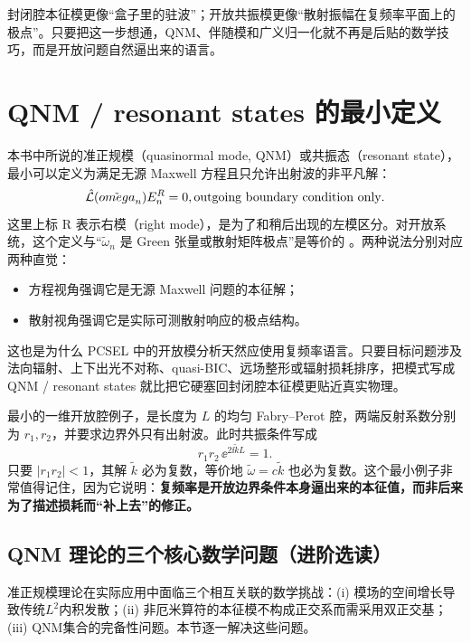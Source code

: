封闭腔本征模更像“盒子里的驻波”；开放共振模更像“散射振幅在复频率平面上的极点”。只要把这一步想通，QNM、伴随模和广义归一化就不再是后贴的数学技巧，而是开放问题自然逼出来的语言。

\section{QNM / resonant states 的最小定义}
本书中所说的准正规模（quasinormal mode, QNM）或共振态（resonant state），最小可以定义为满足无源 Maxwell 方程且只允许出射波的非平凡解：
\begin{equation}
\hat{\mathcal L}(\tilde{\omega}_n)\E_n^{\mathrm{R}}=0,
\qquad
\text{outgoing boundary condition only}.
\label{eq:qnm_definition_appendix}
\end{equation}
这里上标 $\mathrm{R}$ 表示右模（right mode），是为了和稍后出现的左模区分。对开放系统，这个定义与“$\tilde{\omega}_n$ 是 Green 张量或散射矩阵极点”是等价的 \cite{sauvan2013qnm,alpeggiani2017qnm}。两种说法分别对应两种直觉：
\begin{itemize}
  \item 方程视角强调它是无源 Maxwell 问题的本征解；
  \item 散射视角强调它是实际可测散射响应的极点结构。
\end{itemize}

这也是为什么 PCSEL 中的开放模分析天然应使用复频率语言。只要目标问题涉及法向辐射、上下出光不对称、quasi-BIC、远场整形或辐射损耗排序，把模式写成 QNM / resonant states 就比把它硬塞回封闭腔本征模更贴近真实物理。

\begin{ExampleBox}
最小的一维开放腔例子，是长度为 $L$ 的均匀 Fabry--Perot 腔，两端反射系数分别为 $r_1,r_2$，并要求边界外只有出射波。此时共振条件写成
\begin{equation}
r_1r_2\,\ee^{2\ii\tilde{k}L}=1.
\label{eq:qnm_fp_condition}
\end{equation}
只要 $|r_1r_2|<1$，其解 $\tilde{k}$ 必为复数，等价地 $\tilde{\omega}=c\tilde{k}$ 也必为复数。这个最小例子非常值得记住，因为它说明：\textbf{复频率是开放边界条件本身逼出来的本征值，而非后来为了描述损耗而“补上去”的修正。}
\end{ExampleBox}
\subsection{QNM 理论的三个核心数学问题（进阶选读）}
准正规模理论在实际应用中面临三个相互关联的数学挑战：(i) 模场的空间增长导致传统$L^2$内积发散；(ii) 非厄米算符的本征模不构成正交系而需采用双正交基；(iii) QNM集合的完备性问题。本节逐一解决这些问题。

